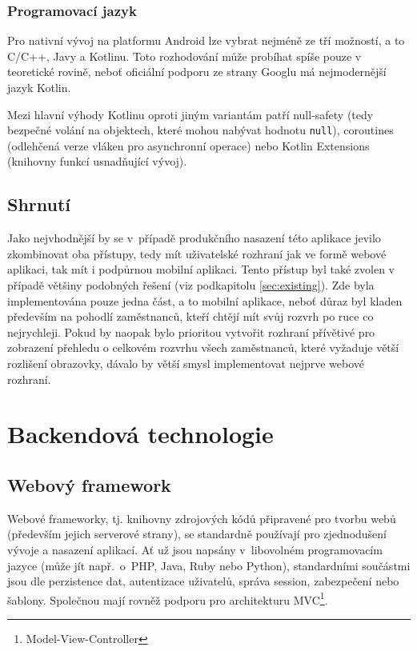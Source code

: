 \documentclass[twoside]{ctuthesis}
\begin{document}
\begin{enumerate}[label=\textbf{O\arabic*.}]
\subsubsection{Programovací jazyk}
Pro nativní vývoj na platformu Android lze vybrat nejméně ze tří možností, a to C/C++, Javy a Kotlinu. Toto rozhodování může probíhat spíše pouze v teoretické rovině, neboť oficiální podporu ze strany Googlu má nejmodernější jazyk Kotlin.

Mezi hlavní výhody Kotlinu oproti jiným variantám patří null-safety (tedy bezpečné volání na objektech, které mohou nabývat hodnotu \texttt{null}), coroutines (odlehčená verze vláken pro asynchronní operace) nebo Kotlin Extensions (knihovny funkcí usnadňující vývoj).


\subsection{Shrnutí}

Jako nejvhodnější by se v~případě produkčního nasazení této aplikace jevilo zkombinovat oba přístupy, tedy mít uživatelské rozhraní jak ve formě webové aplikaci, tak mít i podpůrnou mobilní aplikaci. Tento přístup byl také zvolen v případě většiny podobných řešení (viz podkapitolu \ref{sec:existing}). Zde byla implementována pouze jedna část, a to mobilní aplikace, neboť důraz byl kladen především na pohodlí zaměstnanců, kteří chtějí mít svůj rozvrh po ruce co nejrychleji. Pokud by naopak bylo prioritou vytvořit rozhraní přívětivé pro zobrazení přehledu o celkovém rozvrhu všech zaměstnanců, které vyžaduje větší rozlišení obrazovky, dávalo by větší smysl implementovat nejprve webové rozhraní.


\section{Backendová technologie}

\subsection{Webový framework}

Webové frameworky, tj. knihovny zdrojových kódů připravené pro tvorbu webů (především jejich serverové strany), se standardně používají pro zjednodušení vývoje a nasazení aplikací. Ať už jsou napsány v~libovolném programovacím jazyce (může jít např.~o~PHP, Java, Ruby nebo Python), standardními součástmi jsou dle \cite{docforge2014web} perzistence dat, autentizace uživatelů, správa session, zabezpečení nebo šablony. Společnou mají rovněž podporu pro  architekturu MVC\footnote{Model-View-Controller}.


\end{enumerate}
\end{document}
